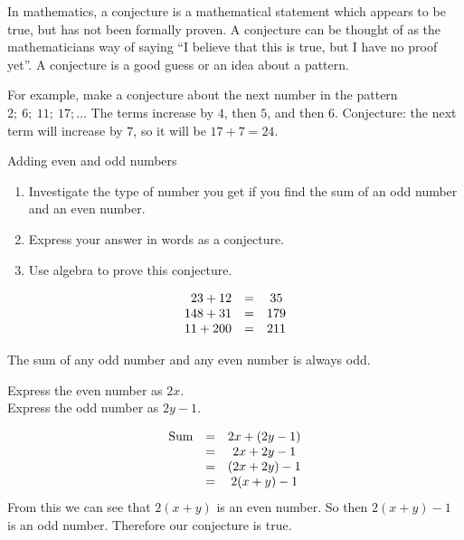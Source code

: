 
In mathematics, a conjecture is a mathematical statement which appears
to be true, but has not been formally proven.  A conjecture can be
thought of as the mathematicians way of saying ``I believe that this
is true, but I have no proof yet''. A conjecture is a good guess or an
idea about a pattern.

For example, make a conjecture about the next number in the pattern
$2;~6;~11;~17;\ldots$ The terms increase by $4$, then $5$, and then $6$.
Conjecture: the next term will increase by $7$, so it will be $17+7=24$.

\begin{wex}{Adding even and odd numbers}
{
\begin{enumerate}[noitemsep, label=\textbf{\arabic*}. ] 
\item Investigate the type of number you get if you find the sum of an odd number and an even number.
\item Express your answer in words as a conjecture.
\item Use algebra to prove this conjecture.
\end{enumerate}
}
{   
  \begin{equation*}
    \begin{array}{ccc}\hfill 23 + 12 &=& 35\\ 148 + 31 &=& 179\\ 11 +200 &=& 211 \end{array}
   \end{equation*}

The sum of any odd number and any even number is always odd.

Express the even number as $2x$.\\
Express the odd number as $2y-1$.

\begin{equation*}
    \begin{array}{ccc}\hfill \mbox{Sum} &=& 2x + (2y-1)\\  &=& 2x + 2y - 1\\ &=& (2x + 2y) - 1 \\ &=& 2(x+y) -1 \end{array}
\end{equation*}
From this we can see that $2(x+y)$ is an even number. So then
$2(x+y)-1$ is an odd number. Therefore our conjecture is true.
}
\end{wex}



